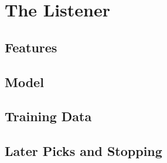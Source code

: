 \section{The Listener}\label{sec:listener}

\subsection{Features}

\subsection{Model}

\subsection{Training Data}

\subsection{Later Picks and Stopping}
